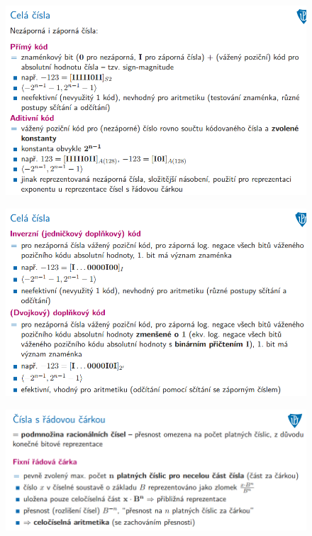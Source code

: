 \documentclass[10pt,a4paper]{article}
\begin{document}
\begin{figure} [h]
	\includegraphics[scale=0.65]{img/prvni_odstavec/otazka3/cela_cisla2.png}	
\end{figure}

\begin{figure} [h]
	\includegraphics[scale=0.65]{img/prvni_odstavec/otazka3/cela_cisla3.png}	
\end{figure}

\begin{figure} [h]
	\includegraphics[scale=0.65]{img/prvni_odstavec/otazka3/cisla_s_radovou_carkou1.png}	
\end{figure}
\end{document}
